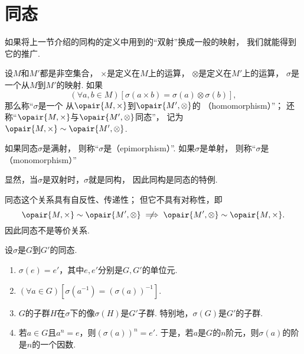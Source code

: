 \section{同态}
如果将上一节介绍的同构的定义中用到的“双射”换成一般的映射，
我们就能得到它的推广.

\begin{definition}
设\(M\)和\(M'\)都是非空集合，
\(\times\)是定义在\(M\)上的运算，
\(\otimes\)是定义在\(M'\)上的运算，
\(\sigma\)是一个从\(M\)到\(M'\)的映射.
如果\[
	(\forall a,b \in M)[
		\sigma(a \times b) = \sigma(a) \otimes \sigma(b)
	],
\]
那么称“\(\sigma\)是一个%
从\(\opair{M,\times}\)到\(\opair{M',\otimes}\)的%
（homomorphism）”；
还称“\(\opair{M,\times}\)与\(\opair{M',\otimes}\)同态”，
记为\(\opair{M,\times} \sim \opair{M',\otimes}\).
\end{definition}

如果同态\(\sigma\)是满射，
则称“\(\sigma\)是（epimorphism）”.
如果\(\sigma\)是单射，
则称“\(\sigma\)是（monomorphism）”

显然，当\(\sigma\)是双射时，\(\sigma\)就是同构，
因此同构是同态的特例.

同态这个关系具有自反性、传递性；
但它不具有对称性，即\[
	\opair{M,\times}\sim\opair{M',\otimes}
	\notimplies
	\opair{M',\otimes}\sim\opair{M,\times}.
\]
因此同态不是等价关系.

\begin{property}
设\(\sigma\)是\(G\)到\(G'\)的同态.
\begin{enumerate}
	\item \(\sigma(e)=e'\)，其中\(e,e'\)分别是\(G,G'\)的单位元.
	\item \((\forall a \in G)[\sigma(a^{-1})=(\sigma(a))^{-1}]\).
	\item \(G\)的子群\(H\)在\(\sigma\)下的像\(\sigma(H)\)是\(G'\)子群.
	特别地，\(\sigma(G)\)是\(G'\)的子群.
	\item 若\(a \in G\)且\(a^n = e\)，则\((\sigma(a))^n = e'\).
	于是，若\(a\)是\(G\)的\(n\)阶元，则\(\sigma(a)\)的阶是\(n\)的一个因数.
\end{enumerate}
\end{property}

